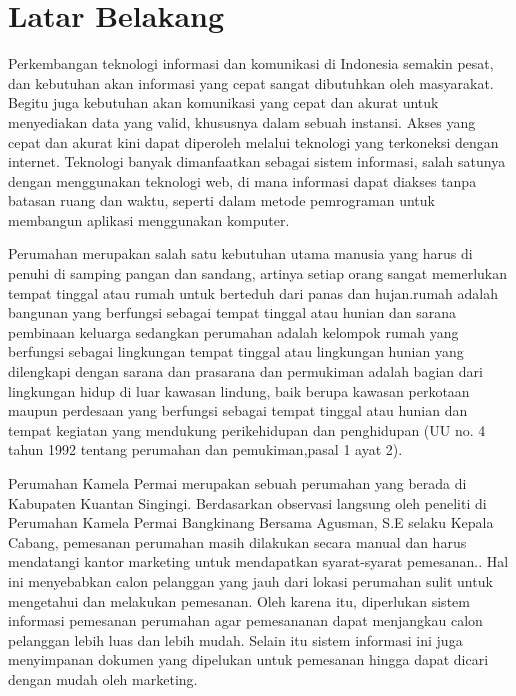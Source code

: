 
   \section{Latar Belakang}\par  Perkembangan teknologi informasi dan komunikasi di Indonesia semakin pesat, dan kebutuhan akan informasi yang cepat sangat dibutuhkan oleh masyarakat. Begitu juga kebutuhan akan komunikasi yang cepat dan akurat untuk menyediakan data yang valid, khususnya dalam sebuah instansi. Akses yang cepat dan akurat kini dapat diperoleh melalui teknologi yang terkoneksi dengan internet. Teknologi banyak dimanfaatkan sebagai sistem informasi, salah satunya dengan menggunakan teknologi web, di mana informasi dapat diakses tanpa batasan ruang dan waktu, seperti dalam metode pemrograman untuk membangun aplikasi menggunakan komputer.\par Perumahan merupakan salah satu kebutuhan utama manusia yang harus di penuhi di samping pangan dan sandang, artinya setiap orang sangat memerlukan tempat tinggal atau rumah untuk berteduh dari panas dan hujan.rumah adalah bangunan yang berfungsi sebagai tempat tinggal atau hunian dan sarana pembinaan keluarga sedangkan perumahan adalah kelompok rumah yang berfungsi sebagai lingkungan tempat tinggal atau lingkungan hunian yang dilengkapi dengan sarana dan prasarana dan permukiman adalah bagian dari lingkungan hidup di luar kawasan lindung, baik berupa kawasan perkotaan maupun perdesaan yang berfungsi sebagai tempat tinggal atau hunian dan tempat kegiatan yang mendukung perikehidupan dan penghidupan (UU no. 4 tahun 1992 tentang perumahan dan pemukiman,pasal 1 ayat 2).\par Perumahan Kamela Permai merupakan sebuah perumahan yang berada di Kabupaten Kuantan Singingi. Berdasarkan observasi langsung oleh peneliti di Perumahan Kamela Permai Bangkinang Bersama Agusman, S.E selaku Kepala Cabang, pemesanan perumahan masih dilakukan secara manual dan harus mendatangi kantor marketing untuk mendapatkan syarat-syarat pemesanan.. Hal ini menyebabkan calon pelanggan yang jauh dari lokasi perumahan sulit untuk mengetahui dan melakukan pemesanan. Oleh karena itu, diperlukan sistem informasi pemesanan perumahan agar pemesananan dapat menjangkau calon pelanggan lebih luas dan lebih mudah. Selain itu sistem informasi ini juga menyimpanan dokumen yang dipelukan untuk pemesanan hingga dapat dicari dengan mudah oleh marketing.
    